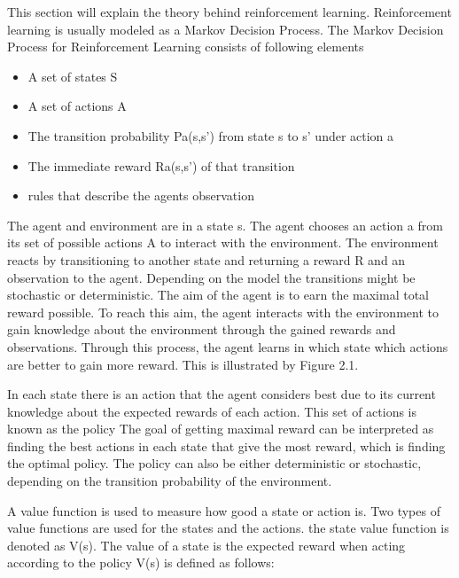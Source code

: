 \vspace{0.5cm}

This section will explain the theory behind reinforcement learning. Reinforcement learning is usually modeled as a Markov Decision Process. The Markov Decision Process for Reinforcement Learning consists of following elements %

\begin{itemize}
	\item A set of states S
	\item A set of actions A
	\item The transition probability Pa(s,s') from state s to s' under action a
	\item The immediate reward Ra(s,s') of that transition
	\item rules that describe the agents observation
\end{itemize}

The agent and environment are in a state s. The agent chooses an action a from its set of possible actions A to interact with the environment. The environment reacts by transitioning to another state and returning a reward R and an observation to the agent. Depending on the model the transitions might be stochastic or deterministic. The aim of the agent is to earn the maximal total reward possible. To reach this aim, the agent interacts with the environment to gain knowledge about the environment through the gained rewards and observations. Through this process, the agent learns in which state which actions are better to gain more reward. This is illustrated by Figure 2.1.

\vspace{0.5cm}


In each state there is an action that the agent considers best due to its current knowledge about the expected rewards of each action. This set of actions is known as the policy 
The goal of getting maximal reward can be interpreted as finding the best actions in each state that give the most reward, which is finding the optimal policy. The policy can also be either deterministic or stochastic, depending on the transition probability of the environment.

\vspace{0.5cm}

A value function is used to measure how good a state or action is. Two types of value functions are used for the states and the actions. the state value function is denoted as V(s). The value of a state is the expected reward when acting according to the policy 
V(s) is defined as follows:

